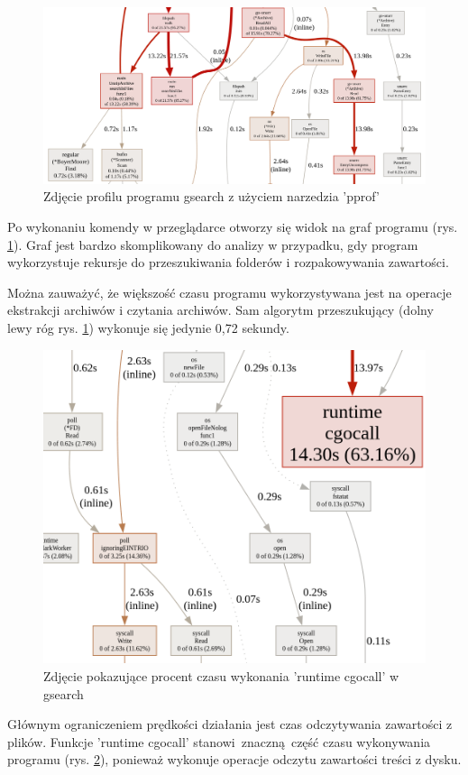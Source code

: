 \begin{figure}[htbp]
\centering
\includegraphics[width=1\textwidth]{./images/profiler1.png}
\caption{Zdjęcie profilu programu gsearch z użyciem narzedzia 'pprof'}
\label{fig:profilerGsearch1}
\end{figure}

Po wykonaniu komendy w przeglądarce otworzy się widok na graf programu (rys. \ref{fig:profilerGsearch1}).
Graf jest bardzo skomplikowany do analizy w przypadku, gdy program wykorzystuje rekursje do
przeszukiwania folderów i rozpakowywania zawartości.

Można zauważyć, że większość czasu programu wykorzystywana jest na operacje 
ekstrakcji archiwów i czytania archiwów. Sam algorytm przeszukujący (dolny lewy 
róg rys. \ref{fig:profilerGsearch1}) wykonuje się jedynie 0,72 sekundy.

\begin{figure}[htbp]
\centering
\includegraphics[width=1\textwidth]{./images/profiler2.png}
\caption{Zdjęcie pokazujące procent czasu wykonania 'runtime cgocall' w gsearch}
\label{fig:profilerGsearch2}
\end{figure}

Głównym ograniczeniem prędkości działania jest czas odczytywania zawartości z plików.
Funkcje 'runtime cgocall' stanowi znaczną część czasu
wykonywania programu (rys. \ref{fig:profilerGsearch2}), ponieważ wykonuje operacje
odczytu zawartości treści z dysku.